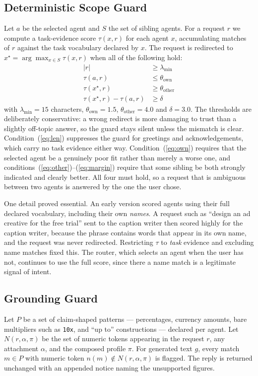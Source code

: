 \documentclass[journal]{IEEEtran}
\begin{document}
\subsection{Deterministic Scope Guard}
Let $a$ be the selected agent and $S$ the set of sibling agents. For a request
$r$ we compute a task-evidence score $\tau(x, r)$ for each agent $x$,
accumulating matches of $r$ against the task vocabulary declared by $x$. The
request is redirected to $x^\star = \arg\max_{x \in S} \tau(x, r)$ when all of
the following hold:
\begin{align}
|r| &\ge \lambda_{\min} \label{eq:len}\\
\tau(a, r) &\le \theta_{\text{own}} \label{eq:own}\\
\tau(x^\star, r) &\ge \theta_{\text{other}} \label{eq:other}\\
\tau(x^\star, r) - \tau(a, r) &\ge \delta \label{eq:margin}
\end{align}
with $\lambda_{\min}=15$ characters, $\theta_{\text{own}}=1.5$,
$\theta_{\text{other}}=4.0$ and $\delta=3.0$. The thresholds are deliberately
conservative: a wrong redirect is more damaging to trust than a slightly
off-topic answer, so the guard stays silent unless the mismatch is clear.
Condition~(\ref{eq:len}) suppresses the guard for greetings and
acknowledgements, which carry no task evidence either way.
Condition~(\ref{eq:own}) requires that the selected agent be a genuinely poor
fit rather than merely a worse one, and
conditions~(\ref{eq:other})--(\ref{eq:margin}) require that some sibling be
both strongly indicated and clearly better. All four must hold, so a request
that is ambiguous between two agents is answered by the one the user chose.

One detail proved essential. An early version scored agents using their full
declared vocabulary, including their own \emph{names}. A request such as
``design an ad creative for the free trial'' sent to the caption writer then
scored highly for the caption writer, because the phrase contains words that
appear in its own name, and the request was never redirected. Restricting
$\tau$ to \emph{task} evidence and excluding name matches fixed this. The
router, which selects an agent when the user has not, continues to use the full
score, since there a name match is a legitimate signal of intent.

\subsection{Grounding Guard}
Let $P$ be a set of claim-shaped patterns --- percentages, currency amounts,
bare multipliers such as \texttt{10x}, and ``up to'' constructions --- declared
per agent. Let $N(r, \alpha, \pi)$ be the set of numeric tokens appearing in
the request $r$, any attachment $\alpha$, and the composed profile $\pi$. For
generated text $g$, every match $m \in P$ with numeric token $n(m) \notin
N(r,\alpha,\pi)$ is flagged. The reply is returned unchanged with an appended
notice naming the unsupported figures.
\end{document}
